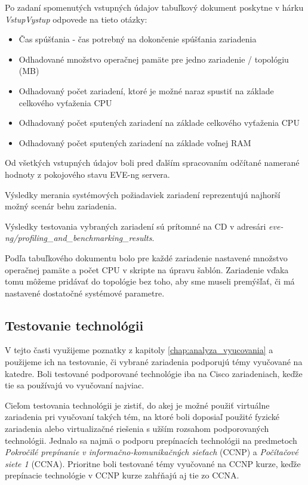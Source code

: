 Po zadaní spomenutých vstupných údajov tabuľkový dokument poskytne v hárku \emph{VstupVystup} odpovede na tieto otázky:

\begin{itemize}[noitemsep]
    \item Čas spúšťania - čas potrebný na dokončenie spúšťania zariadenia
    \item Odhadované množstvo operačnej pamäte pre jedno zariadenie / topológiu (MB)
    \item Odhadovaný počet zariadení, ktoré je možné naraz spustiť na základe celkového vyťaženia CPU
    \item Odhadovaný počet sputených zariadení na základe celkového vyťaženia CPU
    \item Odhadovaný počet sputených zariadení na základe voľnej RAM
\end{itemize}

Od všetkých vstupných údajov boli pred ďalším spracovaním odčítané namerané hodnoty z pokojového stavu EVE-ng servera.

Výsledky merania systémových požiadaviek zariadení reprezentujú najhorší možný scenár behu zariadenia.

Výsledky testovania vybraných zariadení sú prítomné na CD v adresári \emph{eve-ng/profiling\_and\_benchmarking\_results}.

Podľa tabuľkového dokumentu bolo pre každé zariadenie nastavené množstvo operačnej pamäte a počet CPU v skripte na úpravu šablón. Zariadenie vďaka tomu môžeme pridávať do topológie bez toho, aby sme museli premýšľať, či má nastavené dostatočné systémové parametre.




\subsection{Testovanie technológii}
\label{chap:testovanie_technologii}

V tejto časti využijeme poznatky z kapitoly \ref{chap:analyza_vyucovania} a použijeme ich na testovanie, či vybrané zariadenia podporujú témy vyučované na katedre. Boli testované podporované technológie iba na Cisco zariadeniach, keďže tie sa používajú vo vyučovaní najviac.

Cieľom testovania technológii je zistiť, do akej je možné použiť virtuálne zariadenia pri vyučovaní takých tém, na ktoré boli doposiaľ použité fyzické zariadenia alebo virtualizačné riešenia s užším rozsahom podporovaných technológii. Jednalo sa najmä o podporu prepínacích technológii na predmetoch \emph{Pokročilé prepínanie v informačno-komunikačných sieťach} (CCNP) a \emph{Počítačové siete 1} (CCNA). Prioritne boli testované témy vyučované na CCNP kurze, keďže prepínacie technológie v CCNP kurze zahŕňajú aj tie zo CCNA.



